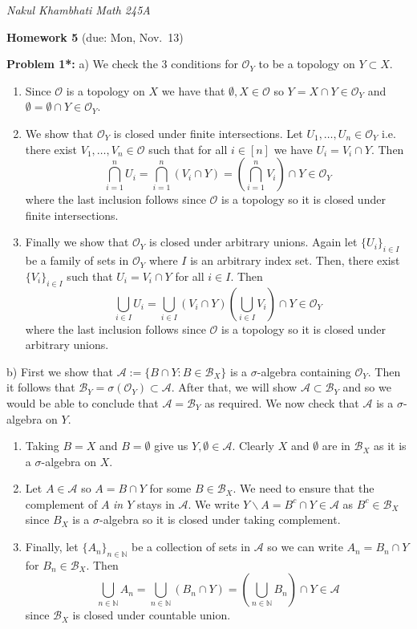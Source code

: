 \documentclass[12pt]{amsart} %
\def\N{\mathbb{N}}
\def\O{\mathcal{O}}
\def\B{\mathcal{B}}
\def\A{\mathcal{A}}
\begin{document}
\thispagestyle{empty}
\pagestyle{empty}
\noindent 
\textsl{Nakul Khambhati  \hfill Math 245A}

\bigskip\bigskip
\centerline {\textbf{Homework 5} (due: Mon, Nov.~13) }

 



\bigskip
\noindent
\textbf{Problem 1*:}  
a) We check the 3 conditions for $\O_Y$ to be a topology on  $Y \subset X$. 
\begin{enumerate}
	\item Since $\O$ is a topology on $X$ we have that $\emptyset, X \in \O$ so $Y = X \cap Y  \in \O_Y $ and $ \emptyset = \emptyset \cap Y \in  \O_Y$. 
	\item We show that $\O_Y$ is closed under finite intersections. Let $U_1, \ldots, U_n \in \O_Y$ i.e. there exist $V_1, \ldots, V_n \in \O$ such that for all $i \in [n]$ we have
		$U_i = V_i \cap Y.$ Then $$\bigcap_{i = 1}^n U_i =  \bigcap_{i = 1}^n (V_i \cap Y) = \left(\bigcap_{i = 1}^n V_i\right) \cap Y \in \O_Y$$ where the last inclusion follows since $\O$ is a topology so it is closed under finite intersections. 
	\item Finally we show that $\O_Y$ is closed under arbitrary unions. Again let $\{U_i\}_{i \in I}$ be a family of sets in $\O_Y$ where $I$ is an arbitrary index set. Then, there exist
		$\{V_i\}_{i \in I}$ such that $U_i = V_i \cap Y$ for all $i \in I$. Then $$\bigcup_{i \in I} U_i = \bigcup_{i \in I} \left( V_i \cap Y \right) \left( \bigcup_{i \in I}
		V_i\right) \cap Y \in \O_Y $$ where the last inclusion follows since $\O$ is a topology so it is closed under arbitrary unions. 
	\end{enumerate}
\smallskip 
b) First we show that $\mathcal{A} := \{B \cap Y : B \in \B_X\} $ is a $\sigma$-algebra containing $\O_Y$. Then it follows that $\B_Y = \sigma(\O_Y) \subset \mathcal{A}$. After that, we will show $\mathcal{A} \subset \B_Y$ and so we would be able to conclude that $\mathcal{A} = \B_Y$ as required. We now check that $\mathcal{A}$ is a $\sigma$-algebra on $Y$.
\begin{enumerate}
	\item Taking $B = X$ and  $B = \emptyset$ give us $Y,\emptyset \in \A$. Clearly $X$ and  $\emptyset$ are in  $\B_X$ as it is a $\sigma$-algebra on $X$.  
	\item Let $A \in \A$ so $A = B \cap Y$ for some $B \in \B_X$. We need to ensure that the complement of $A$ \emph{in $Y$} stays in $\A$. We write $Y \backslash A = B^c \cap Y \in \A$
		as $B^c \in \B_X$ since $B_X$ is a  $\sigma$-algebra so it is closed under taking complement.
	\item Finally, let $\{A_n\}_{n \in \N}$ be a collection of sets in $\A$ so we can write  $A_n = B_n \cap Y$ for $B_n \in \B_X$. Then $$\bigcup_{n \in \N} A_n = \bigcup_{n \in \N}
		\left( B_n \cap Y \right)  = \left( \bigcup_{n \in \N} B_n  \right) \cap Y \in \A $$ since $\B_X$ is closed under countable union. 
\end{enumerate}
\end{document}
